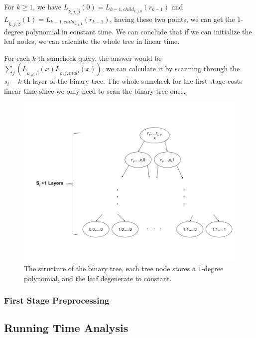 For $k \ge 1$, we have $L_{k, j, \tilde{\beta}}(0)=L_{k-1, child_{k, j, 0}}(r_{k-1})$ and $L_{k, j, \tilde{\beta}}(1)=L_{k-1, child_{k, j, 1}}(r_{k-1})$, having these two points, we can get the $1$-degree polynomial in constant time. We can conclude that if we can initialize the leaf nodes, we can calculate the whole tree in linear time.

For each $k$-th sumcheck query, the answer would be $\sum_{j}(L_{k, j, \tilde{\beta}}(x)L_{k, j, \tilde{mult}}(x))$, we can calculate it by scanning through the $s_i-k$-th layer of the binary tree. The whole sumcheck for the first stage costs linear time since we only need to scan the binary tree once.

\begin{figure}
\label{fig::bin_structure}
\includegraphics[width=15cm]{structurebintree.png}
\caption{The structure of the binary tree, each tree node stores a $1$-degree polynomial, and the leaf degenerate to constant.}
\end{figure}

\subsubsection{First Stage Preprocessing}

\subsection{Running Time Analysis}